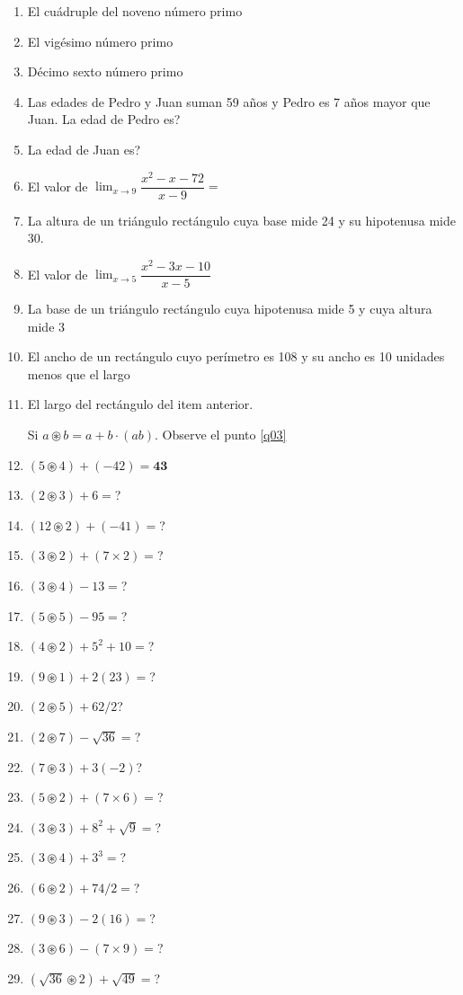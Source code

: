 \documentclass[letterpaper,11pt,twoside]{article}
\begin{document}
\begin{multicols}{2}
\begin{enumerate}
\item El cuádruple del noveno número primo
\item El vigésimo número primo
\item Décimo sexto número primo
\item Las edades de Pedro y Juan suman 59 años y Pedro es 7 años mayor que Juan. La edad de Pedro es?
\item La edad de Juan es?
\item El valor de $\displaystyle{\lim_{x\rightarrow 9}\dfrac{x^{2}-x-72}{x-9}}=$
\item La altura de un triángulo rectángulo cuya base mide 24 y su hipotenusa mide 30.
\item El valor de $\displaystyle{\lim_{x\rightarrow 5}\dfrac{x^{2}-3x-10}{x-5}}$
\item La base de un triángulo rectángulo cuya hipotenusa mide 5 y cuya altura mide 3
\item El ancho de un rectángulo cuyo perímetro es 108 y su ancho es 10 unidades menos que el largo
\item El largo del rectángulo del item anterior.

Si $a\circledast b=a+b\cdot (ab)$. Observe el punto \ref{q03}
\item $(5\circledast 4)+(-42)=\textbf{43}$ \label{q03}
\item $(2\circledast 3)+6=$?
\item $(12\circledast 2)+(-41)=$?
\item $(3\circledast 2)+(7\times 2)=$?
\item $(3\circledast 4)-13=$?
\item $(5\circledast 5)-95=$?
\item $(4\circledast 2)+5^{2}+10=$?
\item $(9\circledast 1)+2(23)=$?
\item $(2\circledast 5)+62/2$?
\item $(2\circledast 7)-\sqrt{36}=$?
\item $(7\circledast 3)+3(-2)$?
\item $(5\circledast 2)+(7\times 6)=$?
\item $(3\circledast 3)+8^{2}+\sqrt{9}=$?
\item $(3\circledast 4)+3^{3}=$?
\item $(6\circledast 2)+74/2=$?
\item $(9\circledast 3)-2(16)=$?
\item $(3\circledast 6)-(7\times 9)=$?
\item $(\sqrt{36}\circledast 2)+\sqrt{49}=$?
\end{enumerate}
\end{multicols}
\end{document}
